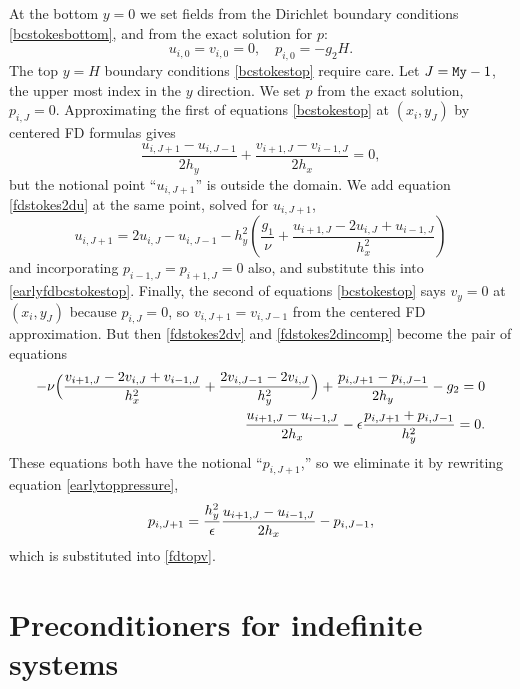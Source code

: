 At the bottom $y=0$ we set fields from the Dirichlet boundary conditions \eqref{bcstokesbottom}, and from the exact solution for $p$:
\begin{equation}
  u_{i,0} = v_{i,0} = 0, \quad p_{i,0} = - g_2 H. \label{fdbcstokesbottom}
\end{equation}
The top $y=H$ boundary conditions \eqref{bcstokestop} require care.  Let $J=\text{\texttt{My}}-1$, the upper most index in the $y$ direction.  We set $p$ from the exact solution, $p_{i,J} = 0$.  Approximating the first of equations \eqref{bcstokestop} at $(x_i,y_J)$ by centered FD formulas gives
\begin{equation}
  \frac{u_{i,J+1}-u_{i,J-1}}{2h_y} + \frac{v_{i+1,J}-v_{i-1,J}}{2h_x} = 0, \label{earlyfdbcstokestop}
\end{equation}
but the notional point ``$u_{i,J+1}$'' is outside the domain.  We add equation \eqref{fdstokes2du} at the same point, solved for $u_{i,J+1}$,
\begin{equation}
  u_{i,J+1} = 2 u_{i,J} - u_{i,J-1} - h_y^2 \left(\frac{g_1}{\nu} + \frac{u_{i+1,J} - 2 u_{i,J} + u_{i-1,J}}{h_x^2}\right) \label{earlyfdstokes2dutop} 
\end{equation}
and incorporating $p_{i-1,J}=p_{i+1,J}=0$ also, and substitute this into \eqref{earlyfdbcstokestop}.  Finally, the second of equations \eqref{bcstokestop} says $v_y=0$ at $(x_i,y_J)$ because $p_{i,J}=0$, so $v_{i,J+1} = v_{i,J-1}$ from the centered FD approximation.  But then \eqref{fdstokes2dv} and \eqref{fdstokes2dincomp} become the pair of equations
\begin{align}
-\nu \Big(\frac{v_{i+1,J} - 2 v_{i,J} + v_{i-1,J}}{h_x^2} + \frac{2 v_{i,J-1} - 2 v_{i,J}}{h_y^2}\Big) + \frac{p_{i,J+1}-p_{i,J-1}}{2h_y} - g_2 = 0 \label{fdtopv} \\
\frac{u_{i+1,J}-u_{i-1,J}}{2h_x}  - \epsilon \frac{p_{i,J+1} + p_{i,J-1}}{h_y^2} = 0. \label{earlytoppressure}
\end{align}
These equations both have the notional ``$p_{i,J+1}$,'' so we eliminate it by rewriting equation \eqref{earlytoppressure},
\begin{equation}
p_{i,J+1} = \frac{h_y^2}{\epsilon} \frac{u_{i+1,J}-u_{i-1,J}}{2h_x} - p_{i,J-1},\label{fdtoppressureelim}
\end{equation}
which is substituted into \eqref{fdtopv}.

\section{Preconditioners for indefinite systems}

